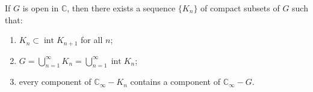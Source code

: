 If $G$ is open in $\mathbb{C}$, then there exists a sequence $\{K_n\}$ of compact subsets of $G$ such that:

\begin{enumerate}
\item[(a)] $K_n \subset \operatorname{int} K_{n+1}$ for all $n$;
\item[(b)] $G = \bigcup_{n=1}^{\infty} K_n = \bigcup_{n=1}^{\infty} \operatorname{int} K_n$;
\item[(c)] every component of $\mathbb{C}_{\infty} - K_n$ contains a component of $\mathbb{C}_{\infty} - G$.
\end{enumerate}
